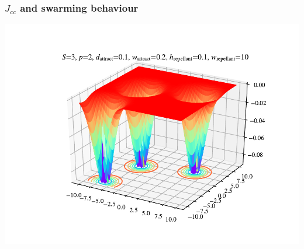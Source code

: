 \documentclass{beamer}
\begin{document}
\begin{frame}
\frametitle{$J_{cc}$ and swarming behaviour}
\begin{center}
\includegraphics[scale=0.5]{assets/swarming}
\end{center}
\end{frame}
\end{document}

